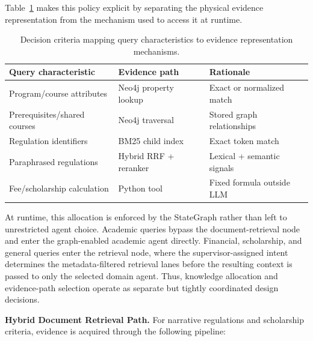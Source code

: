 Table~\ref{tab:decision_criteria} makes this policy explicit by separating the physical evidence representation from the mechanism used to access it at runtime.

\begin{table}[h!]
\centering
\caption{Decision criteria mapping query characteristics to evidence representation mechanisms.}
\label{tab:decision_criteria}
\setlength{\tabcolsep}{3pt}
\begin{tabular}{>{\raggedright\arraybackslash}p{}>{\raggedright\arraybackslash}p{}>{\raggedright\arraybackslash}p{}}
\toprule
\textbf{Query characteristic} & \textbf{Evidence path} & \textbf{Rationale} \\
\midrule
Program/course attributes & Neo4j property lookup & Exact or normalized match \\
Prerequisites/shared courses & Neo4j traversal & Stored graph relationships \\
Regulation identifiers & BM25 child index & Exact token match \\
Paraphrased regulations & Hybrid RRF + reranker & Lexical + semantic signals \\
Fee/scholarship calculation & Python tool & Fixed formula outside LLM \\
\bottomrule
\end{tabular}
\end{table}

At runtime, this allocation is enforced by the StateGraph rather than left to unrestricted agent choice. Academic queries bypass the document-retrieval node and enter the graph-enabled academic agent directly. Financial, scholarship, and general queries enter the retrieval node, where the supervisor-assigned intent determines the metadata-filtered retrieval lanes before the resulting context is passed to only the selected domain agent. Thus, knowledge allocation and evidence-path selection operate as separate but tightly coordinated design decisions.

\textbf{Hybrid Document Retrieval Path.}
For narrative regulations and scholarship criteria, evidence is acquired
through the following pipeline:


